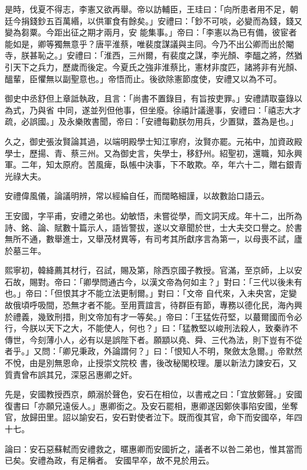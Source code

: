 \begin{pinyinscope}
 是時，伐夏不得志，李憲又欲再舉。帝以訪輔臣，王珪曰：「向所患者用不足，朝廷今捐錢鈔五百萬緡，以供軍食有餘矣。」安禮曰：「鈔不可啖，必變而為錢，錢又變為芻粟。今距出征之期才兩月，安
 能集事。」帝曰：「李憲以為已有備，彼宦者能如是，卿等獨無意乎？唐平淮蔡，唯裴度謀議與主同。今乃不出公卿而出於閹寺，朕甚恥之。」安禮曰：「淮西，三州爾，有裴度之謀，李光顏、李醞之將，然猶引天下之兵力，歷歲而後定。今夏氏之強非淮蔡比，憲材非度匹，諸將非有光顏、醞輩，臣懼無以副聖意也。」帝悟而止。後欲除憲節度使，安禮又以為不可。



 御史中丞舒但上章詆執政，且言：「尚書不置錄目，有旨按吏罪。」安禮請取臺錄以為式，乃與省
 中同，遂並列但他事，但坐廢。徐禧計議邊事，安禮曰：「禧志大才疏，必誤國。」及永樂敗書聞，帝曰：「安禮每勸朕勿用兵，少置獄，蓋為是也。」



 久之，御史張汝賢論其過，以端明殿學士知江寧府，汝賢亦罷。元祐中，加資政殿學士，歷揚、青、蔡三州。又為御史言，失學士，移舒州。紹聖初，還職，知永興軍。二年，知太原府。苦風痺，臥帳中決事，下不敢欺。卒，年六十二，贈右銀青光祿大夫。



 安禮偉風儀，論議明辨，常以經綸自任，而闊略細謹，以故數詒口語云。



 王安國，字平甫，安禮之弟也。幼敏悟，未嘗從學，而文詞天成。年十二，出所為詩、銘、論、賦數十篇示人，語皆警拔，遂以文章聞於世，士大夫交口譽之。於書無所不通，數舉進士，又舉茂材異等，有司考其所獻序言為第一，以母喪不試，廬於墓三年。



 熙寧初，韓絳薦其材行，召試，賜及第，除西京國子教授。官滿，至京師，上以安石故，賜對。帝曰：「卿學問通古今，以漢文帝為何如主？」對曰：「三代以後未有也。」帝曰：「但恨其才不能立法更制爾。」對曰：「文帝
 自代來，入未央宮，定變故俄頃呼吸間，恐無才者不能。至用賈誼言，待群臣有節，專務以德化民，海內興於禮義，幾致刑措，則文帝加有才一等矣。」帝曰：「王猛佐苻堅，以蕞爾國而令必行，今朕以天下之大，不能使人，何也？」曰：「猛教堅以峻刑法殺人，致秦祚不傳世，今刻薄小人，必有以是誤陛下者。願顓以堯、舜、三代為法，則下豈有不從者乎。」又問：「卿兄秉政，外論謂何？」曰：「恨知人不明，聚斂太急爾。」帝默然不悅，由是別無恩命，止授崇文院校
 書，後改秘閣校理。屢以新法力諫安石，又質責曾布誤其兄，深惡呂惠卿之奸。



 先是，安國教授西京，頗溺於聲色，安石在相位，以書戒之曰：「宜放鄭聲。」安國復書曰「亦願兄遠佞人。」惠卿銜之。及安石罷相，惠卿遂因鄭俠事陷安國，坐奪官，放歸田里。詔以諭安石，安石對使者泣下。既而復其官，命下而安國卒，年四十七。



 論曰：安石惡蘇軾而安禮救之，暱惠卿而安國折之，議者不以咎二弟也，惟其當而已矣。安禮為政，有足稱者。
 安國早卒，故不見於用云。



\end{pinyinscope}